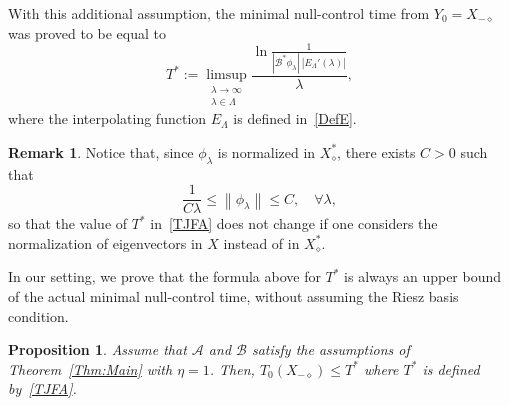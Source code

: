 \documentclass[11pt]{article}
\newtheorem{prop}[theo]{Proposition}
\theoremstyle{definition}
\newtheorem{rema}[theo]{Remark}
\numberwithin{equation}{section}
\numberwithin{figure}{section}
\numberwithin{table}{section}
\newcommand\A{\mathcal{A}}
\newcommand\B{\mathcal{B}}
\newcommand\Bs{\mathcal{B}^*}
\newcommand{\Xalphas}{X_\diamond^*}
\newcommand{\Xmalpha}{X_{-\diamond}}
\newcommand{\Fzp}{Y_0}
\newcommand{\normeX}[1]{\left\| #1 \right\|}
\let\oldforall\forall
\renewcommand*{\forall}{\mathrel{\oldforall}}
\begin{document}
\begingroup
With this additional assumption, the minimal null-control time from $\Fzp=\Xmalpha$ was proved to be equal to
\begin{equation}\label{TJFA}
T^*:=\limsup_{\substack{\lambda\to \infty\\ \lambda\in \Lambda}} \frac{\ln \frac{1}{| \Bs\phi_\lambda | \: | E_\Lambda' (\lambda) |}}{ \lambda },
\end{equation}
where the interpolating function $E_\Lambda$ is defined in~\eqref{DefE}.
\endgroup

\begin{rema}
Notice that, since $\phi_\lambda$ is normalized in $\Xalphas$, there exists $C>0$ such that
\[
\frac{1}{C \lambda} \leq \normeX{\phi_\lambda} \leq C, \quad \forall \lambda,
\]
so that the value of $T^*$ in~\eqref{TJFA} does not change if one considers the normalization of eigenvectors in $X$ instead of in $\Xalphas$.
\end{rema}

In our setting, we prove that the formula above for $T^*$ is always an upper bound of the actual minimal null-control time, without assuming the Riesz basis condition.

\begin{prop}\label{Prop:T_0<T*}
Assume that $\A$ and $\B$ satisfy the assumptions of Theorem~\ref{Thm:Main} with $\eta=1$. Then, $T_0(\Xmalpha) \leq T^*$ where $T^*$ is defined by~\eqref{TJFA}.
\end{prop}
\end{document}
